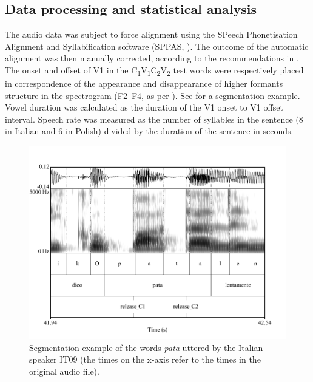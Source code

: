 \documentclass[preprint]{JASAnew}
\begin{document}
\hypertarget{data-processing-and-statistical-analysis}{%
\subsection{Data processing and statistical
analysis}\label{data-processing-and-statistical-analysis}}

\label{s:process}

The audio data was subject to force alignment using the SPeech
Phonetisation Alignment and Syllabification software (SPPAS,
\citealt{bigi2015}). The outcome of the automatic alignment was then
manually corrected, according to the recommendations in
\citet{machac2009}. The onset and offset of V1 in the
C\textsubscript{1}V\textsubscript{1}C\textsubscript{2}V\textsubscript{2}
test words were respectively placed in correspondence of the appearance
and disappearance of higher formants structure in the spectrogram
(F2--F4, as per \citealt{machac2009}). See  for a
segmentation example. Vowel duration was calculated as the duration of
the V1 onset to V1 offset interval. Speech rate was measured as the
number of syllables in the sentence (8 in Italian and 6 in Polish)
divided by the duration of the sentence in seconds.

\begin{figure}
  \centering
  \includegraphics[width=5in]{Figure2.pdf}
  \caption{Segmentation example of the words \textit{pata} uttered by the Italian speaker IT09 (the times on the x-axis refer to the times in the original audio file).}
  \label{f:segmentation}
\end{figure}
\end{document}
